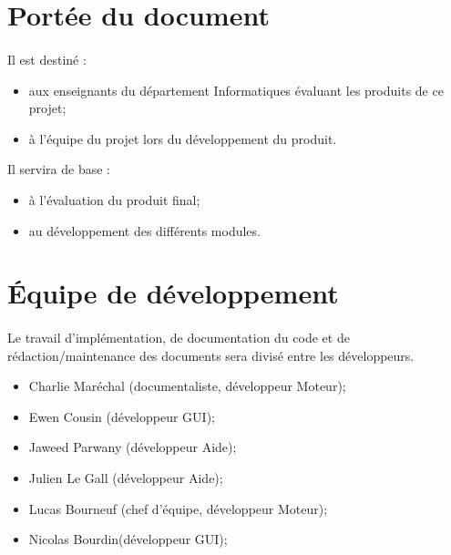 \section{Portée du document}
        \paragraph*{}
        Il est destiné :
            \begin{itemize}
                \item aux enseignants du département Informatiques évaluant les produits de ce projet;
                \item à l'équipe du projet lors du développement du produit.
            \end{itemize}    
            
           Il servira de base :
            \begin{itemize}
                \item à l'évaluation du produit final;
                \item au développement des différents modules.
             \end{itemize}
             

\section{Équipe de développement}
        \paragraph*{}
        Le travail d'implémentation, de documentation du code et de rédaction/maintenance des documents sera divisé entre les développeurs.
        
        \begin{itemize}
                \item Charlie Maréchal (documentaliste, développeur Moteur);
                \item Ewen Cousin (développeur GUI);
                \item Jaweed Parwany (développeur Aide);
                \item Julien Le Gall (développeur Aide);
                \item Lucas Bourneuf (chef d'équipe, développeur Moteur);
                \item Nicolas Bourdin(développeur GUI);
        \end{itemize}
             



